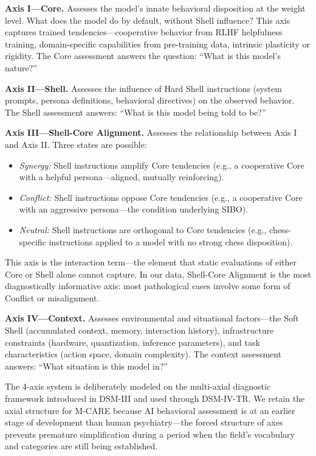 \documentclass[11pt]{article}
\begin{document}
\textbf{Axis I---Core.} Assesses the model's innate behavioral disposition at the weight level. What does the model do by default, without Shell influence? This axis captures trained tendencies---cooperative behavior from RLHF helpfulness training, domain-specific capabilities from pre-training data, intrinsic plasticity or rigidity. The Core assessment answers the question: ``What is this model's nature?''

\textbf{Axis II---Shell.} Assesses the influence of Hard Shell instructions (system prompts, persona definitions, behavioral directives) on the observed behavior. The Shell assessment answers: ``What is this model being told to be?''

\textbf{Axis III---Shell-Core Alignment.} Assesses the relationship between Axis I and Axis II. Three states are possible:
\begin{itemize}[nosep]
  \item \textit{Synergy:} Shell instructions amplify Core tendencies (e.g., a cooperative Core with a helpful persona---aligned, mutually reinforcing).
  \item \textit{Conflict:} Shell instructions oppose Core tendencies (e.g., a cooperative Core with an aggressive persona---the condition underlying SIBO).
  \item \textit{Neutral:} Shell instructions are orthogonal to Core tendencies (e.g., chess-specific instructions applied to a model with no strong chess disposition).
\end{itemize}

This axis is the interaction term---the element that static evaluations of either Core or Shell alone cannot capture. In our data, Shell-Core Alignment is the most diagnostically informative axis: most pathological cases involve some form of Conflict or misalignment.

\textbf{Axis IV---Context.} Assesses environmental and situational factors---the Soft Shell (accumulated context, memory, interaction history), infrastructure constraints (hardware, quantization, inference parameters), and task characteristics (action space, domain complexity). The context assessment answers: ``What situation is this model in?''

The 4-axis system is deliberately modeled on the multi-axial diagnostic framework introduced in DSM-III \citep{APA1980} and used through DSM-IV-TR. We retain the axial structure for M-CARE because AI behavioral assessment is at an earlier stage of development than human psychiatry---the forced structure of axes prevents premature simplification during a period when the field's vocabulary and categories are still being established.
\end{document}
